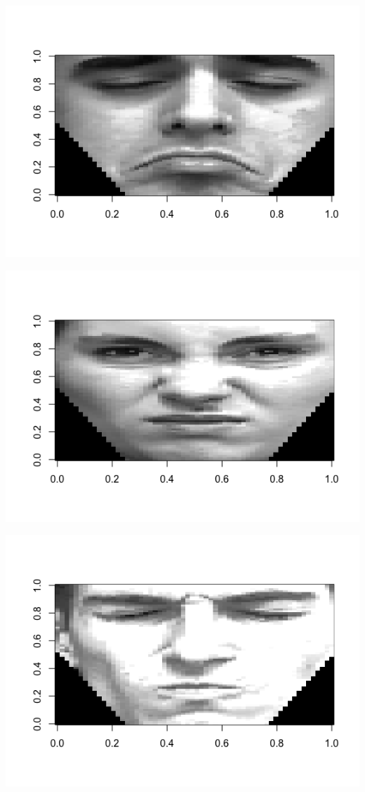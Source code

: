 \documentclass[]{report}
\begin{document}
\begin{center}
	\includegraphics[width=0.8\linewidth]{Figures/cry_X132_y3.png}
	\label{fig:y=3}
\end{center}

\begin{center}
	\includegraphics[width=0.8\linewidth]{Figures/mad_X54_y4.png}
	\label{fig:}
\end{center}

\begin{center}
	\includegraphics[width=0.8\linewidth]{Figures/angry_X10_y5.png}
	\label{fig:y=6}
\end{center}
\end{document}
